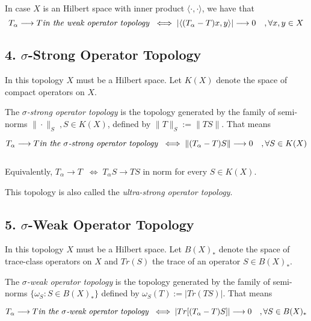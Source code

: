 \documentclass[12pt]{article}
\begin{document}
In case $X$ is an Hilbert space with inner product $\langle \cdot, \cdot \rangle$, we have that
\begin{displaymath}
T_{\alpha} \longrightarrow T \text{\emph{in the weak operator topology}}\;\; \Longleftrightarrow
 \; |\langle (T_{\alpha} - T)x, y \rangle | \longrightarrow 0 \quad, \forall x, y \in X
\end{displaymath}

\subsection{4. $\sigma$-Strong Operator Topology}
In this topology $X$ must be a Hilbert space. Let $K(X)$ denote the space of compact operators on $X$.

The \emph{$\sigma$-strong operator topology} is the topology generated by the family of semi-norms $\|\cdot\|_S\;, S \in K(X)$, defined by $\|T\|_S := \|TS\|$. That means

\begin{displaymath}
 T_{\alpha} \longrightarrow T \text{\emph{in the $\sigma$-strong operator topology}}\;\; \Longleftrightarrow\; \|(T_{\alpha}-T)S\| \longrightarrow 0 \quad, \forall S \in K(X)
\end{displaymath}

$\,$

Equivalently, $T_{\alpha} \longrightarrow T\;\; \Longleftrightarrow \; T_{\alpha}S \longrightarrow TS$ in norm for every $S \in K(X)$.

This topology is also called the \emph{ultra-strong operator topology}.

\subsection{5. $\sigma$-Weak Operator Topology}
In this topology $X$ must be a Hilbert space. Let $B(X)_*$ denote the space of trace-class operators on $X$ and $Tr(S)$ the trace of an operator $S \in B(X)_*$.

The \emph{$\sigma$-weak operator topology} is the topology generated by the family of semi-norms $\{\omega_{S} : S \in B(X)_*\}$ defined by $\omega_{S}(T) := |Tr(TS)|$. That means

\begin{displaymath}
T_{\alpha} \longrightarrow T \text{\emph{in the $\sigma$-weak operator topology}}\;\; \Longleftrightarrow\; |Tr[(T_{\alpha}-T)S]| \longrightarrow 0 \quad, \forall S \in B(X)_*
\end{displaymath}
\end{document}
